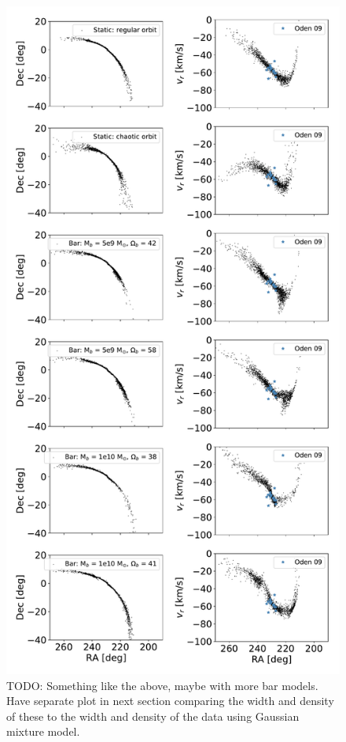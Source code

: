 \documentclass[twocolumn]{aastex62}
\newcommand{\todo}[1]{{\color{red} TODO: #1}}
\begin{document}
\begin{figure}
\centerline{\includegraphics[width=0.7\columnwidth]{bar.pdf}}
\caption{\todo{Something like the above, maybe with more bar models. Have separate plot in next section comparing the width and density of these to the width and density of the data using Gaussian mixture model. }}
\label{fig:sims}
\end{figure}
\end{document}
